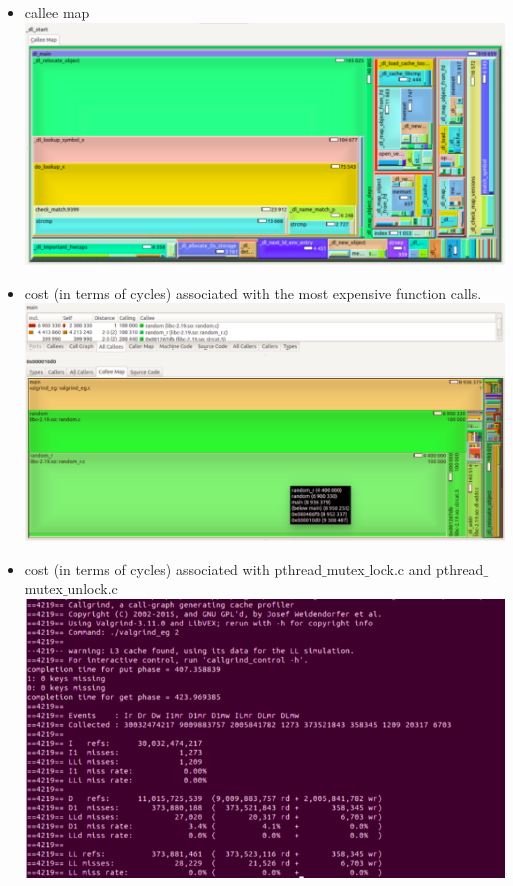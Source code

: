 \documentclass{sem5}
\begin{document}
\begin{enumerate}
\begin{itemize}
\item callee map\\
\centering
\includegraphics[scale=.4]{pic1.png}
\item cost (in terms of cycles) associated with the most expensive function calls.\\
\centering
\includegraphics[scale=.4]{pic2.png}
\item cost (in terms of cycles) associated with pthread$\_$mutex$\_$lock.c and pthread$\_$mutex$\_$unlock.c\\
\centering
\includegraphics[scale=.4]{pic3.png}

\end{itemize}
\end{enumerate}
\end{document}
